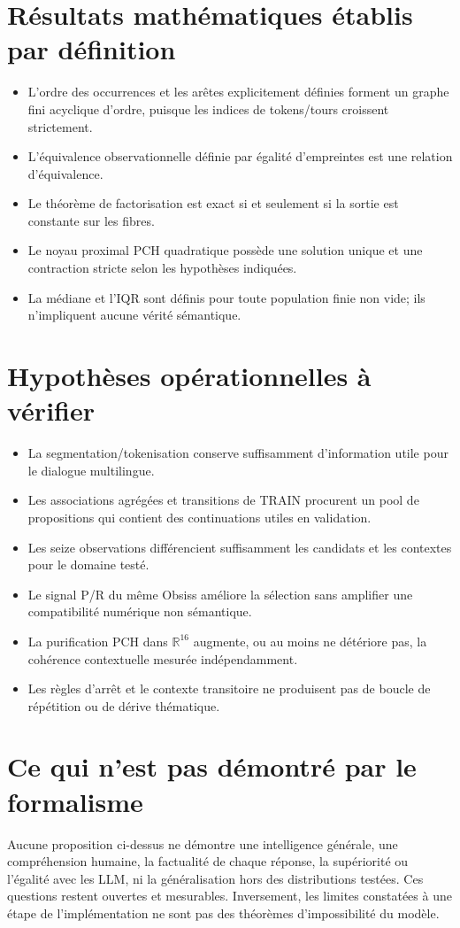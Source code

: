 \documentclass[11pt,a4paper]{report}
\newcommand{\R}{\mathbb R}
\begin{document}
\section{Résultats mathématiques établis par définition}
\begin{itemize}
\item L'ordre des occurrences et les arêtes explicitement définies forment un graphe fini acyclique d'ordre, puisque les indices de tokens/tours croissent strictement.
\item L'équivalence observationnelle définie par égalité d'empreintes est une relation d'équivalence.
\item Le théorème de factorisation est exact si et seulement si la sortie est constante sur les fibres.
\item Le noyau proximal PCH quadratique possède une solution unique et une contraction stricte selon les hypothèses indiquées.
\item La médiane et l'IQR sont définis pour toute population finie non vide; ils n'impliquent aucune vérité sémantique.
\end{itemize}

\section{Hypothèses opérationnelles à vérifier}
\begin{itemize}
\item La segmentation/tokenisation conserve suffisamment d'information utile pour le dialogue multilingue.
\item Les associations agrégées et transitions de TRAIN procurent un pool de propositions qui contient des continuations utiles en validation.
\item Les seize observations différencient suffisamment les candidats et les contextes pour le domaine testé.
\item Le signal P/R du même Obsiss améliore la sélection sans amplifier une compatibilité numérique non sémantique.
\item La purification PCH dans $\R^{16}$ augmente, ou au moins ne détériore pas, la cohérence contextuelle mesurée indépendamment.
\item Les règles d'arrêt et le contexte transitoire ne produisent pas de boucle de répétition ou de dérive thématique.
\end{itemize}

\section{Ce qui n'est pas démontré par le formalisme}
Aucune proposition ci-dessus ne démontre une intelligence générale, une compréhension humaine, la factualité de chaque réponse, la supériorité ou l'égalité avec les LLM, ni la généralisation hors des distributions testées. Ces questions restent ouvertes et mesurables. Inversement, les limites constatées à une étape de l'implémentation ne sont pas des théorèmes d'impossibilité du modèle.
\end{document}
